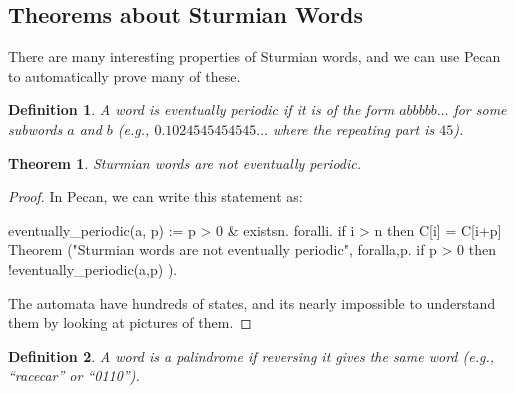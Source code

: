 \documentclass[landscape,usenames,dvipsnames]{sciposter}
\newtheorem{thm}{Theorem}%
\newtheorem*{defin}{Definition}
\begin{document}
\begin{multicols}{3}

\columnbreak

\section*{Theorems about Sturmian Words}

There are many interesting properties of Sturmian words, and we can use Pecan to automatically prove many of these.

\begin{defin}
    A word is eventually periodic if it is of the form $abbbbb \ldots$ for some subwords $a$ and $b$ (e.g., $0.1024545454545\ldots$ where the repeating part is $45$).
\end{defin}

\begin{mdframed}[style=MyFrame]
\begin{thm}
Sturmian words are not eventually periodic.
\end{thm}
\end{mdframed}
\begin{proof}
In Pecan, we can write this statement as:

\begin{pecan}
eventually_periodic(a, p) := 
    p > 0 & existsn. foralli. if i > n then C[i] = C[i+p]
Theorem ("Sturmian words are not eventually periodic", 
{ foralla,p. if p > 0 then !eventually_periodic(a,p) }).
\end{pecan}

The automata have hundreds of states, and its nearly impossible to understand them by looking at pictures of them.
\end{proof}

\begin{defin}
    A word is a palindrome if reversing it gives the same word (e.g., ``racecar'' or ``0110'').
\end{defin}


\end{multicols}
\end{document}
